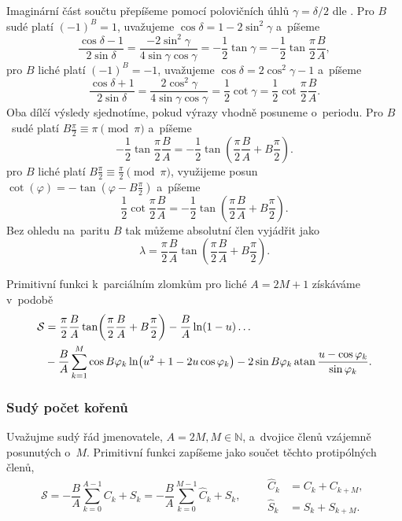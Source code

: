 Imaginární část součtu přepíšeme pomocí polovičních úhlů $\gamma=\delta/2$ dle . Pro $B$ sudé platí $(-1)^B=1$, uvažujeme $\cos\delta=1-2\sin^2\gamma$ a~píšeme
\begin{equation}
    \frac{\cos\delta - 1}{2\sin\delta} = \frac{-2\sin^2\gamma}{4\sin\gamma\cos\gamma} = -\frac{1}{2}\tan\gamma=-\frac{1}{2}\tan\frac{\pi}{2}\frac{B}{A},
\end{equation}
pro $B$ liché platí $(-1)^B=-1$, uvažujeme $\cos\delta = 2\cos^2\gamma-1$ a~píšeme
\begin{equation}
    \frac{\cos\delta + 1}{2\sin\delta} = \frac{2\cos^2\gamma}{4\sin\gamma\cos\gamma} = \frac{1}{2}\cot\gamma=\frac{1}{2}\cot\frac{\pi}{2}\frac{B}{A}.
\end{equation}
Oba dílčí výsledy sjednotíme, pokud výrazy vhodně posuneme o~periodu. Pro $B$~sudé platí $B\frac{\pi}{2}\equiv \pi\pmod \pi$ a~píšeme
\begin{equation}
    -\frac{1}{2}\tan\frac{\pi}{2}\frac{B}{A}=-\frac{1}{2}\tan\!\left(\frac{\pi}{2}\frac{B}{A}+B\frac{\pi}{2}\right).
\end{equation}
pro $B$ liché platí $B\frac{\pi}{2}\equiv\frac{\pi}{2}\pmod\pi$, využijeme posun $\cot(\varphi)=-\tan(\varphi-B\frac{\pi}{2})$ a~píšeme
\begin{equation}
    \frac{1}{2}\cot\frac{\pi}{2}\frac{B}{A}=-\frac{1}{2}\tan\!\left(\frac{\pi}{2}\frac{B}{A}+B\frac{\pi}{2}\right).
\end{equation}
Bez ohledu na~paritu $B$ tak můžeme absolutní člen vyjádřit jako 
\begin{equation}
    \lambda=\frac{\pi}{2}\frac{B}{A}\tan\left(\frac{\pi}{2}\frac{B}{A}+B\frac{\pi}{2}\right).
\end{equation}

Primitivní funkci k~parciálním zlomkům pro liché $A=2M+1$ získáváme v~podobě
\begin{align}\label{eq:solution_odd}
    \mathcal{S}&=\frac{\pi}{2}\frac{B}{A}\tan\!\left(\frac{\pi}{2}\frac{B}{A}+B\frac{\pi}{2}\right)-\frac{B}{A}\ln(1-u)\dots\nonumber\\
    &-\frac{B}{A}\sum_{k=1}^{M}\cos{B\varphi_k}\ln\!\left(u^2+1-2u\cos\varphi_k\right)-2\sin{B\varphi_k}\operatorname{atan}\frac{u-\cos\varphi_k}{\sin\varphi_k}.
\end{align}

\subsubsection{Sudý počet kořenů}
Uvažujme sudý řád jmenovatele, $A=2M, M\in\mathbb{N}$, a~dvojice členů vzájemně posunutých o~$M$. Primitivní funkci zapíšeme jako součet těchto protipólných členů,
\begin{equation}
    \mathcal{S}=-\frac{B}{A}\sum_{k=0}^{A-1}C_k+S_k=-\frac{B}{A}\sum_{k=0}^{M-1}\hat{C}_k+\hat{S}_k,\qquad \begin{aligned}\hat{C}_k&=C_k+C_{k+M},\\\hat{S}_k&=S_k+S_{k+M}.\end{aligned}
\end{equation}

